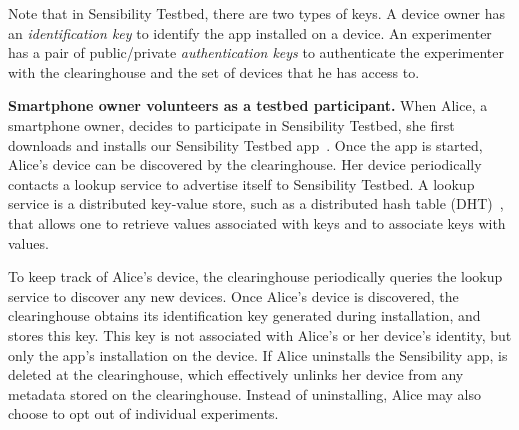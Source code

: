 Note that in Sensibility Testbed, there are two types of keys. A device
owner has an \textit{identification key} to identify the app installed on a 
device. An experimenter has a pair of public/private \textit{authentication 
keys} to authenticate the experimenter with the clearinghouse and 
the set of devices that he has access to.

\textbf{Smartphone owner volunteers as a testbed participant.}
When Alice, a smartphone owner, decides to participate in
Sensibility Testbed, she first downloads and installs our Sensibility Testbed
app~\cite{sensibility-app}. %
Once the app is started, Alice's device can be
discovered by the clearinghouse. Her device periodically contacts 
a lookup service to advertise itself to Sensibility Testbed. 
A lookup service is a distributed key-value store, such as a 
distributed hash table (DHT)~\cite{dht}, that 
allows one to retrieve values associated with keys and to associate 
keys with values. 

To keep track of Alice's device, the
clearinghouse periodically queries the lookup service to
discover any new devices. Once Alice's device is discovered, the
clearinghouse obtains its identification key  generated
during installation, and stores this key. 
This key is not associated with Alice's or her
device's identity, but only the app's installation on the device. If
Alice uninstalls the Sensibility app,  is
deleted at the clearinghouse, which effectively unlinks
her device from any metadata stored on the clearinghouse.
Instead of uninstalling, Alice may also choose to opt out of
individual experiments.

